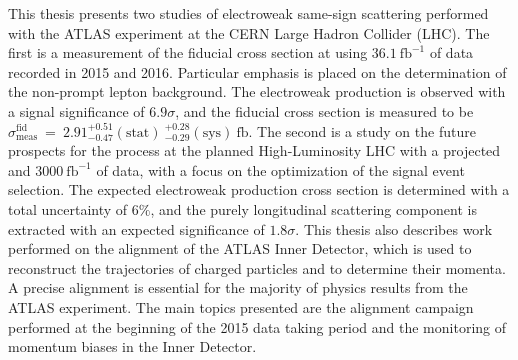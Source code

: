 This thesis presents two studies of electroweak same-sign \ssww scattering performed with the ATLAS experiment at the CERN Large Hadron Collider (LHC).
The first is a measurement of the fiducial cross section at  using $36.1~\mathrm{fb}^{-1}$ of data recorded in 2015 and 2016.
Particular emphasis is placed on the determination of the non-prompt lepton background.
The electroweak production is observed with a signal significance of $6.9\sigma$, and the fiducial cross section is measured to be $\sigma_{\textrm{meas}}^{\textrm{fid}}~=~2.91^{+0.51}_{-0.47}(\textrm{stat})~^{+0.28}_{-0.29}(\textrm{sys})~\textrm{fb}$.
The second is a study on the future prospects for the \ssww process at the planned High-Luminosity LHC with a projected  and $3000~\mathrm{fb}^{-1}$ of data, with a focus on the optimization of the signal event selection.
The expected electroweak production cross section is determined with a total uncertainty  of $6\%$, and the purely longitudinal scattering component is extracted with an expected significance of $1.8\sigma$.
This thesis also describes work performed on the alignment of the ATLAS Inner Detector, which is used to reconstruct the trajectories of charged particles and to determine their momenta.
A precise alignment is essential for the majority of physics results from the ATLAS experiment.
The main topics presented are the alignment campaign performed at the beginning of the 2015 data taking period and the monitoring of momentum biases in the Inner Detector.
